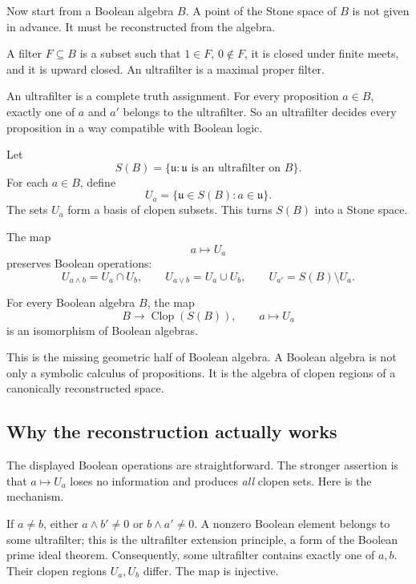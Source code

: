 Now start from a Boolean algebra \(B\).  A point of the Stone space of \(B\) is not given in advance.  It must be reconstructed from the algebra.

\begin{definition}
A filter \(F\subseteq B\) is a subset such that \(1\in F\), \(0\notin F\), it is closed under finite meets, and it is upward closed.  An ultrafilter is a maximal proper filter.
\end{definition}

An ultrafilter is a complete truth assignment.  For every proposition \(a\in B\), exactly one of \(a\) and \(a'\) belongs to the ultrafilter.  So an ultrafilter decides every proposition in a way compatible with Boolean logic.

Let
\[
  S(B)=\{\mathfrak u : \mathfrak u\text{ is an ultrafilter on }B\}.
\]
For each \(a\in B\), define
\[
  U_a=\{\mathfrak u\in S(B):a\in\mathfrak u\}.
\]
The sets \(U_a\) form a basis of clopen subsets.  This turns \(S(B)\) into a Stone space.

The map
\[
  a\longmapsto U_a
\]
preserves Boolean operations:
\[
  U_{a\wedge b}=U_a\cap U_b,
  \qquad
  U_{a\vee b}=U_a\cup U_b,
  \qquad
  U_{a'}=S(B)\setminus U_a.
\]

\begin{theorem}
For every Boolean algebra \(B\), the map
\[
  B\longrightarrow \operatorname{Clop}(S(B)),
  \qquad
  a\longmapsto U_a
\]
is an isomorphism of Boolean algebras.
\end{theorem}

This is the missing geometric half of Boolean algebra.  A Boolean algebra is not only a symbolic calculus of propositions.  It is the algebra of clopen regions of a canonically reconstructed space.


\subsection{Why the reconstruction actually works}

The displayed Boolean operations are straightforward. The stronger assertion is that $a\mapsto U_a$ loses no information and produces \emph{all} clopen sets. Here is the mechanism.

If $a\ne b$, either $a\wedge b'\ne0$ or $b\wedge a'\ne0$. A nonzero Boolean element belongs to some ultrafilter; this is the ultrafilter extension principle, a form of the Boolean prime ideal theorem. Consequently, some ultrafilter contains exactly one of $a,b$. Their clopen regions $U_a,U_b$ differ. The map is injective.

